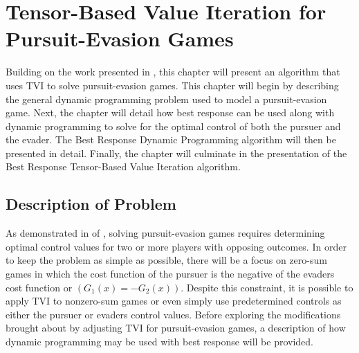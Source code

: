 \chapter{Tensor-Based Value Iteration for Pursuit-Evasion Games}\label{chp:tvipe}
Building on the work presented in , this chapter will present an algorithm that uses TVI to solve pursuit-evasion games. This chapter will begin by describing the general dynamic programming problem used to model a pursuit-evasion game. Next, the chapter will detail how best response can be used along with dynamic programming to solve for the optimal control of both the pursuer and the evader. The Best Response Dynamic Programming algorithm will then be presented in detail. Finally, the chapter will culminate in the presentation of the Best Response Tensor-Based Value Iteration algorithm.  

\section{Description of Problem}\label{peprobdes}
As demonstrated in  of , solving pursuit-evasion games requires determining optimal control values for two or more players with opposing outcomes. In order to keep the problem as simple as possible, there will be a focus on zero-sum games in which the cost function of the pursuer is the negative of the evaders cost function or $(G_1(x) = -G_2(x))$. Despite this constraint, it is possible to apply TVI to nonzero-sum games or even simply use predetermined controls as either the pursuer or evaders control values. Before exploring the modifications brought about by adjusting TVI for pursuit-evasion games, a description of how dynamic programming may be used with best response will be provided.

